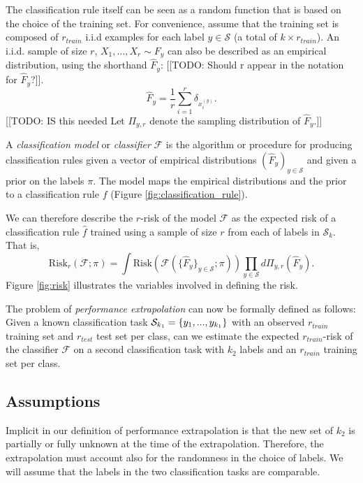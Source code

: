\documentclass[12pt]{article}
\begin{document}
The classification rule itself can be seen as a random function that is based on the choice of the training set. For convenience, assume that the training set is composed of $r_{train}$ 
i.i.d examples for each label $y \in \mathcal{S}$ (a total of $k\times r_{train}$).
An i.i.d. sample of size $r$, $X_1,\hdots, X_r \sim F_y$ can also be described 
as an empirical distribution, using the shorthand $\hat{F}_y$: [[TODO: Should r appear in the notation for $\hat{F}_y$?]].
\[\hat{F}_y = \frac{1}{r}\sum_{i=1}^r \delta_{x_i^{(y)}}.\]
[[TODO: IS this needed Let $\Pi_{y, r}$ denote the sampling distribution of $\hat{F}_y$.]]

A \emph{classification model} or \emph{classifier} $\mathcal{F}$ is the 
algorithm or procedure for producing classification rules given a 
vector of empirical distributions $(\hat{F}_y)_{y\in \mathcal{S}}$ and given a prior on the labels $\pi$.
The model maps the empirical distributions and the prior to a classification rule $f$ (Figure \ref{fig:classification_rule}).

We can therefore describe the $r$-risk of the model $\mathcal{F}$
as the expected risk of a classification rule $\hat{f}$ trained 
using a sample of size $r$ from each of labels in $\mathcal{S}_k$.
That is,
\[
\text{Risk}_r(\mathcal{F}; \pi) =
\int \text{Risk}(\mathcal{F}(\{\hat{F}_y\}_{y \in \mathcal{S}};
\pi)) \prod_{y \in \mathcal{S}} d\Pi_{y, r}(\hat{F}_y).
\]
Figure \ref{fig:risk} illustrates the variables involved in defining
the risk.

The problem of \emph{performance extrapolation} can now be formally defined as follows:
Given a known classification task $\mathcal{S}_{k_1}=\{y_1,...,y_{k_1}\}$ with an observed $r_{train}$ training set and $r_{test}$ test set per class, 
can we estimate the expected $r_{train}$-risk of the classifier $\mathcal{F}$ on a second classification task with $k_2$ labels and an $r_{train}$ training set per class.

\subsection{Assumptions}

Implicit in our definition of performance extrapolation is that the new set of $k_2$ is partially
or fully unknown at the time of the extrapolation. Therefore, 
the extrapolation must account also for the randomness in the choice of labels. We will assume that the labels in the two classification 
tasks are comparable. 
\end{document}
